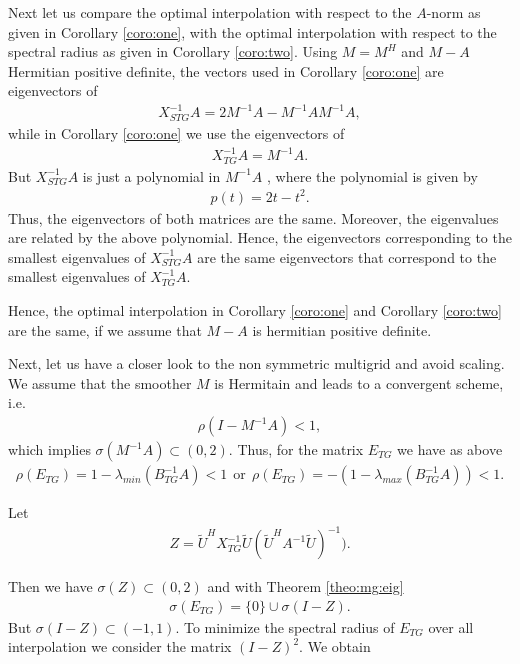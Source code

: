 \documentclass[final]{amsart}
\newcommand{\beqo}{\begin{eqnarray*}}
\newcommand{\beq}{\begin{eqnarray}}
\newcommand{\eeqo}{\end{eqnarray*}}
\newcommand{\eeq}{\end{eqnarray}}
\numberwithin{equation}{section}
\begin{document}
{Next let us compare the optimal interpolation with respect to the $A$-norm as
given in Corollary \ref{coro:one}, with  the optimal interpolation with respect
to the spectral radius as given in Corollary \ref{coro:two}. Using $M=M^H$ and
$M - A$ Hermitian positive definite, the vectors used in  Corollary
\ref{coro:one}
are  eigenvectors of
\beqo
X^{-1}_{STG}A = 2M^{-1}A - M^{-1}AM^{-1}A,
\eeqo
while in Corollary \ref{coro:one} we use  the eigenvectors of
\beqo
X^{-1}_{TG}A = M^{-1}A.
\eeqo
But $X^{-1}_{STG}A$ is just a polynomial in $M^{-1}A$ , where   the polynomial
is given by
\beq \label{eq:pol}
p(t) = 2t - t^2.
\eeq
Thus, the eigenvectors of both matrices are the same. Moreover, the
eigenvalues are  related
by   the above polynomial. Hence, the eigenvectors corresponding  to the
smallest eigenvalues of
$X^{-1}_{STG}A$  are the same   eigenvectors that correspond to the smallest
eigenvalues of $X^{-1}_{TG}A$.

Hence, the optimal interpolation in Corollary \ref{coro:one}  and Corollary
\ref{coro:two} are the same, if we assume that $M - A$ is hermitian positive
definite.

Next, let us have  a closer look to the non symmetric multigrid and avoid
scaling. We assume  that
the smoother $M$ is Hermitain  and  leads to a convergent scheme, i.e.
\beq  \label{eq:smoother:con:}
\rho(I - M^{-1}A) < 1, 
\eeq
which implies $\sigma(M^{-1}A) \subset (0,2).$ Thus, for the matrix $E_{TG}$
we have as above
\beqo
\rho(E_{TG}) = 1 - \lambda_{min}(B_{TG}^{-1}A) < 1 
\ \ \mbox{or} \ \
\rho(E_{TG}) = -(1 - \lambda_{max}(B_{TG}^{-1}A)) < 1.
\eeqo

Let 
\beqo
Z = \tilde U^HX_{TG}^{-1}\tilde U (\tilde U^HA^{-1}\tilde U)^{-1}).
\eeqo

Then we have $\sigma(Z) \subset (0,2)$ and with  Theorem \ref{theo:mg:eig}
\beqo
\sigma(E_{TG}) = \{0\} \cup \sigma(I-Z).
\eeqo
But $\sigma(I-Z) \subset (-1,1) $. To minimize the spectral radius of $E_{TG}$
over all interpolation we consider the matrix $(I - Z)^2$. We  obtain



}
\end{document}
